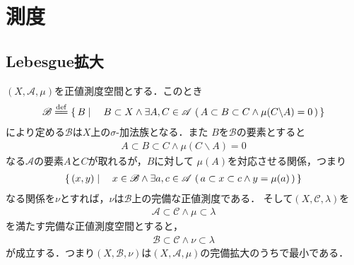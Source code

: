 \section{測度}
	\subsection{Lebesgue拡大}
		\begin{screen}
			\begin{thm}[最小の完備拡大が取れる]
				$(X,\mathscr{A},\mu)$を正値測度空間とする．このとき
				\begin{align}
					\mathscr{B} \defeq
					\Set{B}{B \subset X \wedge \exists A,C \in \mathscr{A}\,
					\left(\, A \subset B \subset C \wedge \mu(C \backslash A)=0\, \right) }
				\end{align}
				により定める$\mathscr{B}$は$X$上の$\sigma$-加法族となる．また
				$B$を$\mathscr{B}$の要素とすると
				\begin{align}
					A \subset B \subset C \wedge \mu(C \backslash A)=0
				\end{align}
				なる$\mathscr{A}$の要素$A$と$C$が取れるが，$B$に対して
				$\mu(A)$を対応させる関係，つまり
				\begin{align}
					\left\{\, (x,y) \mid \quad x \in \mathscr{B} \wedge \exists a,c \in \mathscr{A}\, 
					\left(\, a \subset x \subset c \wedge y = \mu(a)\, \right)\, \right\}
				\end{align}
				なる関係を$\nu$とすれば，$\nu$は$\mathscr{B}$上の完備な正値測度である．
				そして$(X,\mathscr{C},\lambda)$を
				\begin{align}
					\mathscr{A} \subset \mathscr{C} \wedge \mu \subset \lambda
				\end{align}
				を満たす完備な正値測度空間とすると，
				\begin{align}
					\mathscr{B} \subset \mathscr{C} \wedge \nu \subset \lambda
				\end{align}
				が成立する．つまり$(X,\mathscr{B},\nu)$は$(X,\mathscr{A},\mu)$の完備拡大のうちで最小である．
			\end{thm}
		\end{screen}
		
